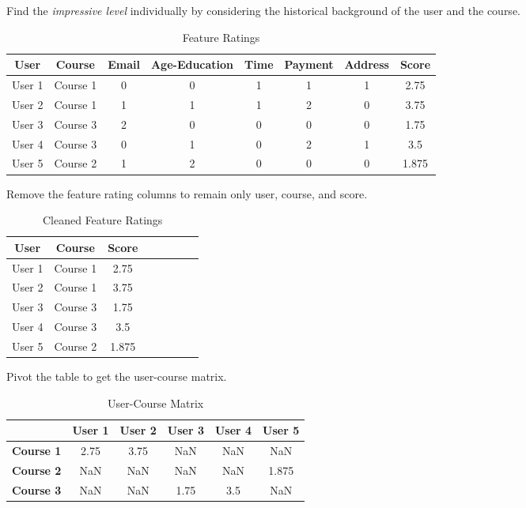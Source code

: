 \noindent Find the \textit{impressive level} individually by considering the historical background of the user and the course.

\begin{table}[H]
\center
\begin{tabular}{|c|c|c|c|c|c|c|c|}
\hline
\textbf{User} &\textbf{Course} &\textbf{Email} &\textbf{Age-Education} &\textbf{Time} &\textbf{Payment} &\textbf{Address} &\textbf{Score} \\
\hline
User 1 & Course 1 & 0 & 0 & 1 & 1 & 1 & 2.75 \\
\hline
User 2 & Course 1 & 1 & 1 & 1 & 2 & 0 & 3.75 \\
\hline
User 3 & Course 3 & 2 & 0 & 0 & 0 & 0 & 1.75 \\
\hline
User 4 & Course 3 & 0 & 1 & 0 & 2 & 1 & 3.5 \\
\hline
User 5 & Course 2 & 1 & 2 & 0 & 0 & 0 & 1.875 \\
\hline
\end{tabular}
\caption{Feature Ratings}
\end{table}

\noindent Remove the feature rating columns to remain only user, course, and score.

\begin{table}[H]
\center
\begin{tabular}{|c|c|c|c|c|c|c|c|}
\hline
\textbf{User} & \textbf{Course} & \textbf{Score} \\
\hline
User 1 & Course 1 & 2.75 \\
\hline
User 2 & Course 1 & 3.75 \\
\hline
User 3 & Course 3 & 1.75 \\
\hline
User 4 & Course 3 & 3.5 \\
\hline
User 5 & Course 2 & 1.875 \\
\hline
\end{tabular}
\caption{Cleaned Feature Ratings}
\end{table}

\noindent Pivot the table to get the user-course matrix.

\begin{table}[H]
\center
\begin{tabular}{|c|c|c|c|c|c|}
\hline
& \textbf{User 1} & \textbf{User 2} & \textbf{User 3} & \textbf{User 4} & \textbf{User 5} \\
\hline
\textbf{Course 1} & 2.75 & 3.75 & NaN & NaN & NaN \\
\hline
\textbf{Course 2} & NaN & NaN & NaN & NaN & 1.875 \\
\hline
\textbf{Course 3} & NaN & NaN & 1.75 & 3.5 & NaN \\
\hline
\end{tabular}
\caption{User-Course Matrix}
\end{table}

